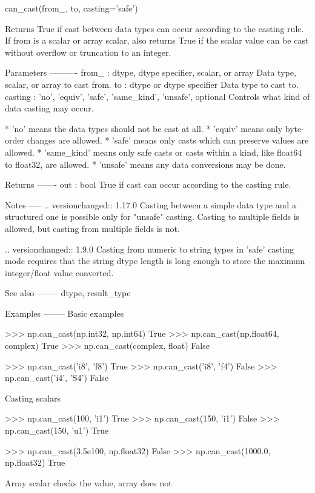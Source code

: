 \begin{DoxyVerb}can_cast(from_, to, casting='safe')

Returns True if cast between data types can occur according to the
casting rule.  If from is a scalar or array scalar, also returns
True if the scalar value can be cast without overflow or truncation
to an integer.

Parameters
----------
from_ : dtype, dtype specifier, scalar, or array
    Data type, scalar, or array to cast from.
to : dtype or dtype specifier
    Data type to cast to.
casting : {'no', 'equiv', 'safe', 'same_kind', 'unsafe'}, optional
    Controls what kind of data casting may occur.

      * 'no' means the data types should not be cast at all.
      * 'equiv' means only byte-order changes are allowed.
      * 'safe' means only casts which can preserve values are allowed.
      * 'same_kind' means only safe casts or casts within a kind,
        like float64 to float32, are allowed.
      * 'unsafe' means any data conversions may be done.

Returns
-------
out : bool
    True if cast can occur according to the casting rule.

Notes
-----
.. versionchanged:: 1.17.0
   Casting between a simple data type and a structured one is possible only
   for "unsafe" casting.  Casting to multiple fields is allowed, but
   casting from multiple fields is not.

.. versionchanged:: 1.9.0
   Casting from numeric to string types in 'safe' casting mode requires
   that the string dtype length is long enough to store the maximum
   integer/float value converted.

See also
--------
dtype, result_type

Examples
--------
Basic examples

>>> np.can_cast(np.int32, np.int64)
True
>>> np.can_cast(np.float64, complex)
True
>>> np.can_cast(complex, float)
False

>>> np.can_cast('i8', 'f8')
True
>>> np.can_cast('i8', 'f4')
False
>>> np.can_cast('i4', 'S4')
False

Casting scalars

>>> np.can_cast(100, 'i1')
True
>>> np.can_cast(150, 'i1')
False
>>> np.can_cast(150, 'u1')
True

>>> np.can_cast(3.5e100, np.float32)
False
>>> np.can_cast(1000.0, np.float32)
True

Array scalar checks the value, array does not


\end{DoxyVerb}
